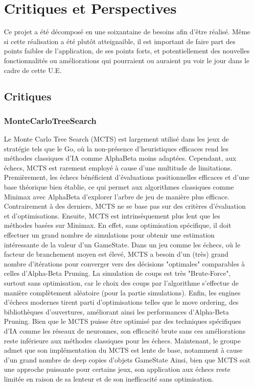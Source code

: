 \documentclass{article}
\begin{document}
\section{Critiques et Perspectives}
Ce projet a été décomposé en une soixantaine de besoins afin d'être réalisé. Même si cette réalisation a été plutôt atteignaible, il est important de
faire part des points faibles de l'application, de ses points forts, et potentiellement des nouvelles fonctionnalités ou améliorations qui pourraient ou 
auraient pu voir le jour dans le cadre de cette U.E.
\subsection{Critiques}
\subsubsection{MonteCarloTreeSearch}
Le Monte Carlo Tree Search (MCTS) est largement utilisé dans les jeux de stratégie tels que le Go, où la non-présence d'heuristiques efficaces rend les méthodes classiques d'IA comme AlphaBeta moins adaptées. Cependant, aux échecs, MCTS est rarement employé à cause d'une multitude de limitations.
Premièrement, les échecs bénéficient d'évaluations positionnelles efficaces et d'une base théorique bien établie, ce qui permet aux algorithmes classiques comme Minimax avec AlphaBeta d'explorer l'arbre de jeu de manière plus efficace. Contrairement à des derniers, MCTS ne se base pas sur des critères d'évaluation et d'optimisations. Ensuite, MCTS est intrinsèquement plus lent que les méthodes basées sur Minimax. En effet, sans optimisation spécifique, il doit effectuer un grand nombre de simulations pour obtenir une estimation intéressante de la valeur d'un GameState. Dans un jeu comme les échecs, où le facteur de branchement moyen est élevé, MCTS a besoin d'un (très) grand nombre d'itérations pour converger vers des décisions "optimales" comparables à celles d'Alpha-Beta Pruning. La simulation de coups est très "Brute-Force", surtout sans optimisation, car le choix des coups par l'algorithme s'effectue de manière complètement aléatoire (pour la partie simulations).
Enfin, les engines d'échecs modernes tirent parti d'optimisations telles que le move ordering, des bibliothèques d'ouvertures, améliorant ainsi les performances d'Alpha-Beta Pruning. Bien que le MCTS puisse être optimisé par des techniques spécifiques d'IA comme les réseaux de neuronnes, son efficacité brute sans ces améliorations reste inférieure aux méthodes classiques pour les échecs. Maintenant, le groupe admet que son implémentation du MCTS est 
lente de base, notamment à cause d'un grand nombre de deep copies d'objets GameState
Ainsi, bien que MCTS soit une approche puissante pour certains jeux, son application aux échecs reste limitée en raison de sa lenteur et de son inefficacité sans optimisation.
\end{document}
